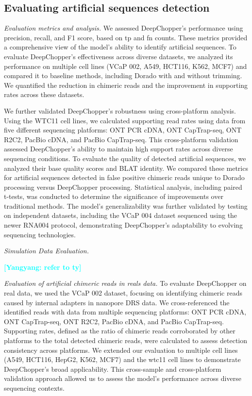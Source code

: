 \documentclass[pdflatex, sn-mathphys-num, lineno]{sn-jnl}%
\newcommand{\yy}[1]{\textcolor{cyan}{\textbf{[Yangyang: #1]}}}
\theoremstyle{thmstyleone}%
\theoremstyle{thmstyletwo}%
\theoremstyle{thmstylethree}%
\begin{document}
\subsection{Evaluating artificial sequences detection}

\textit{Evaluation metrics and analysis.} We assessed DeepChopper's performance using precision, recall, and F1 score, based on \gls{tp} and \gls{fn} counts.
These metrics provided a comprehensive view of the model's ability to identify artificial sequences.
To evaluate DeepChopper's effectiveness across diverse datasets, we analyzed its performance on multiple cell lines (VCaP 002, A549, HCT116, K562, MCF7) and compared it to baseline methods, including Dorado with and without trimming.
We quantified the reduction in chimeric reads and the improvement in supporting rates across these datasets.

We further validated DeepChopper's robustness using cross-platform analysis.
Using the WTC11 cell lines, we calculated supporting read rates using data from five different sequencing platforms: ONT PCR cDNA, ONT CapTrap-seq, ONT R2C2, PacBio cDNA, and PacBio CapTrap-seq.
This cross-platform validation assessed DeepChopper's ability to maintain high support rates across diverse sequencing conditions.
To evaluate the quality of detected artificial sequences, we analyzed their base quality scores and BLAT identity.
We compared these metrics for artificial sequences detected in false positive chimeric reads unique to Dorado processing versus DeepChopper processing.
Statistical analysis, including paired t-tests, was conducted to determine the significance of improvements over traditional methods.
The model's generalizability was further validated by testing on independent datasets, including the VCaP 004 dataset sequenced using the newer RNA004 protocol, demonstrating DeepChopper's adaptability to evolving sequencing technologies.


\textit{Simulation Data Evaluation.}

\yy{refer to ty}


\textit{Evaluation of artificial chimeric reads in reals data.} To evaluate DeepChopper on real data, we used the VCaP 002 dataset, focusing on identifying chimeric reads caused by internal adapters in nanopore DRS data.
We cross-referenced the identified reads with data from multiple sequencing platforms: ONT PCR cDNA, ONT CapTrap-seq, ONT R2C2, PacBio cDNA, and PacBio CapTrap-seq.
Supporting rates, defined as the ratio of chimeric reads corroborated by other platforms to the total detected chimeric reads, were calculated to assess detection consistency across platforms.
We extended our evaluation to multiple cell lines (A549, HCT116, HepG2, K562, MCF7) and the wtc11 cell lines to demonstrate DeepChopper's broad applicability.
This cross-sample and cross-platform validation approach allowed us to assess the model's performance across diverse sequencing contexts.
\end{document}
